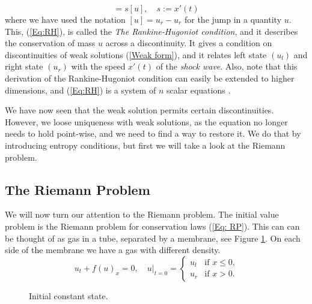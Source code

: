 \documentclass[10pt]{article}
\numberwithin{equation}{section}
\begin{document}
\begin{equation}
    [f] = s[u], \quad s := x'(t) 
    \label{Eq:RH}
\end{equation}
where we have used the notation $[u] = u_r - u_r$ for the jump in a quantity $u$. This, (\ref{Eq:RH}), is called the \textit{The Rankine-Hugoniot condition}, and it describes the conservation of mass $u$ across a discontinuity. It gives a condition on discontinuities of weak solutions (\ref{Weak form}), and it relates left state $(u_l)$ and right state $(u_r)$ with the speed $x'(t)$ of the \textit{shock wave}. Also, note that this derivation of the Rankine-Hugoniot condition can easily be extended to higher dimensions, and (\ref{Eq:RH}) is a system of $n$ scalar equations \cite{GaravelloMauro2006Tfon}.

We have now seen that the weak solution permits certain discontinuities. However, we loose uniqueness with weak solutions, as the equation no longer needs to hold point-wise, and we need to find a way to restore it. We do that by introducing entropy conditions, but first we will take a look at the Riemann problem.

\subsection{The Riemann Problem}
We will now turn our attention to the Riemann problem. The initial value problem is the Riemann problem for conservation laws (\ref{Eq: RP}). This can can be thought of as gas in a tube, separated by a membrane, see Figure \ref{Fig:riemann_tube}. On each side of the membrane we have a gas with different density.
\begin{equation}
 u_t + f(u)_x = 0,  \quad u|_{t = 0 } = \begin{cases} u_l & \text{if $x \leq 0$,}\\ u_r & \text{if $x>0$.} 
 \label{Eq: RP}
 \end{cases}
\end{equation}
\begin{figure}
    \begin{center}
    \caption{Initial constant state.}
    \label{Fig:riemann_tube}
    \end{center}
\end{figure}
\end{document}
